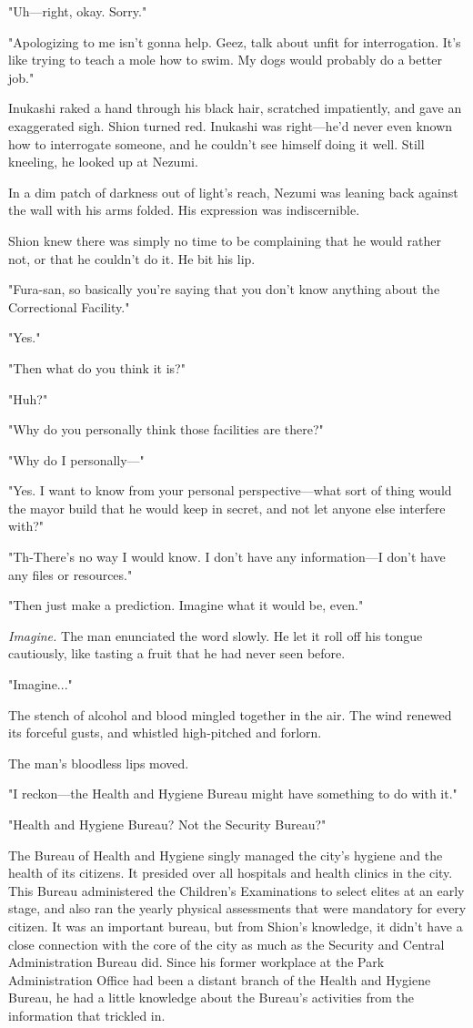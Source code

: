 "Uh---right, okay. Sorry."

"Apologizing to me isn't gonna help. Geez, talk about unfit for
interrogation. It's like trying to teach a mole how to swim. My dogs
would probably do a better job."

Inukashi raked a hand through his black hair, scratched impatiently, and
gave an exaggerated sigh. Shion turned red. Inukashi was right---he'd
never even known how to interrogate someone, and he couldn't see himself
doing it well. Still kneeling, he looked up at Nezumi.

In a dim patch of darkness out of light's reach, Nezumi was leaning back
against the wall with his arms folded. His expression was indiscernible.

Shion knew there was simply no time to be complaining that he would
rather not, or that he couldn't do it. He bit his lip.

"Fura-san, so basically you're saying that you don't know anything about
the Correctional Facility."

"Yes."

"Then what do you think it is?"

"Huh?"

"Why do you personally think those facilities are there?"

"Why do I personally---"

"Yes. I want to know from your personal perspective---what sort of thing
would the mayor build that he would keep in secret, and not let anyone
else interfere with?"

"Th-There's no way I would know. I don't have any information---I don't
have any files or resources."

"Then just make a prediction. Imagine what it would be, even."

\emph{Imagine.} The man enunciated the word slowly. He let it roll off his
tongue cautiously, like tasting a fruit that he had never seen before.

"Imagine..."

The stench of alcohol and blood mingled together in the air. The wind
renewed its forceful gusts, and whistled high-pitched and forlorn.

The man's bloodless lips moved.

"I reckon---the Health and Hygiene Bureau might have something to do with
it."

"Health and Hygiene Bureau? Not the Security Bureau?"

The Bureau of Health and Hygiene singly managed the city's hygiene and
the health of its citizens. It presided over all hospitals and health
clinics in the city. This Bureau administered the Children's
Examinations to select elites at an early stage, and also ran the yearly
physical assessments that were mandatory for every citizen. It was an
important bureau, but from Shion's knowledge, it didn't have a close
connection with the core of the city as much as the Security and Central
Administration Bureau did. Since his former workplace at the Park
Administration Office had been a distant branch of the Health and
Hygiene Bureau, he had a little knowledge about the Bureau's activities
from the information that trickled in.

